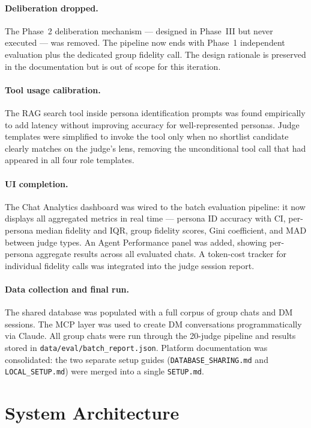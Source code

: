 \documentclass[12pt,a4paper]{article}
\begin{document}
\paragraph{Deliberation dropped.}
The Phase~2 deliberation mechanism --- designed in Phase~III but never executed ---
was removed. The pipeline now ends with
Phase~1 independent evaluation plus the dedicated group fidelity call. The design rationale
is preserved in the documentation but is out of scope for this iteration.

\paragraph{Tool usage calibration.}
The RAG search tool inside persona identification prompts was found empirically to add
latency without improving accuracy for well-represented personas. Judge templates were
simplified to invoke the tool only when no shortlist candidate clearly matches on the
judge's lens, removing the unconditional tool call that had appeared in all four role
templates.

\paragraph{UI completion.}
The Chat Analytics dashboard was wired to the batch evaluation pipeline: it now displays
all aggregated metrics in real time --- persona ID accuracy with CI, per-persona median
fidelity and IQR, group fidelity scores, Gini coefficient, and MAD between judge types.
An Agent Performance panel was added, showing per-persona aggregate results across all
evaluated chats. A token-cost tracker for individual fidelity calls was integrated into
the judge session report.

\paragraph{Data collection and final run.}
The shared database was populated with a full corpus of group chats and DM sessions. The
MCP layer was used to create DM conversations programmatically via Claude. All group chats
were run through the 20-judge pipeline and results stored in
\texttt{data/eval/batch\_report.json}. Platform documentation was consolidated: the two
separate setup guides (\texttt{DATABASE\_SHARING.md} and \texttt{LOCAL\_SETUP.md}) were
merged into a single \texttt{SETUP.md}.

\section{System Architecture}
\end{document}
